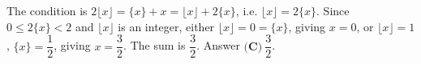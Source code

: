 The condition is $2\lfloor x\rfloor=\{x\}+x=\lfloor x\rfloor+2\{x\}$, i.e. $\lfloor x\rfloor=2\{x\}$. Since $0\le2\{x\}<2$ and $\lfloor x\rfloor$ is an integer, either $\lfloor x\rfloor=0=\{x\}$, giving $x=0$, or $\lfloor x\rfloor=1$, $\{x\}=\dfrac12$, giving $x=\dfrac32$. The sum is $\dfrac32$. Answer $\boxed{\textbf{(C)}\ \dfrac32}$.
